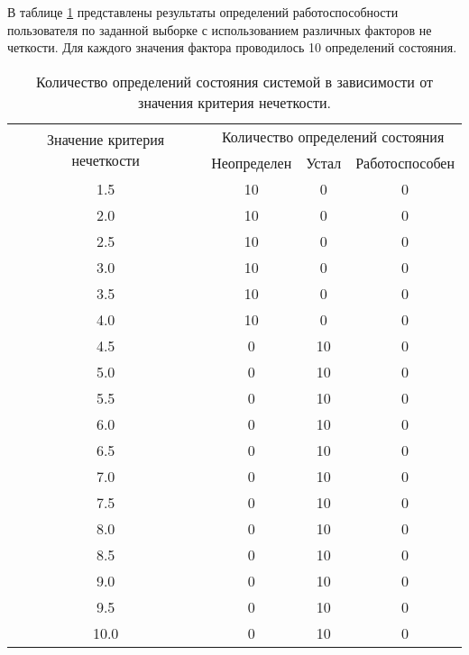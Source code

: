 В таблице \ref{table:time2} представлены результаты определений работоспособности пользователя по заданной выборке с использованием различных факторов не \- четкости. Для каждого значения фактора проводилось 10 определений состояния.

\begin{table}[H]
	\begin{center}
		\caption{\label{table:time2} Количество определений состояния системой в зависимости от значения критерия нечеткости.}
\begin{tabular}{|c|ccc|}
\hline
\multirow{2}{*}{Значение критерия нечеткости} & \multicolumn{3}{c|}{Количество определений состояния}\\ \cline{2-4} & \multicolumn{1}{c|}{Неопределен} & \multicolumn{1}{c|}{Устал} & Работоспособен \\ \hline
1.5& \multicolumn{1}{c|}{10}            & \multicolumn{1}{c|}{0}      &0 \\ \hline
2.0& \multicolumn{1}{c|}{10}            & \multicolumn{1}{c|}{0}     &0 \\ \hline
2.5& \multicolumn{1}{c|}{10}            & \multicolumn{1}{c|}{0}     &0 \\ \hline
3.0& \multicolumn{1}{c|}{10}            & \multicolumn{1}{c|}{0}      &0 \\ \hline
3.5& \multicolumn{1}{c|}{10}            & \multicolumn{1}{c|}{0}      &0 \\ \hline
4.0& \multicolumn{1}{c|}{10}            & \multicolumn{1}{c|}{0}      &0 \\ \hline
4.5& \multicolumn{1}{c|}{0}            & \multicolumn{1}{c|}{10}      &0 \\ \hline
5.0& \multicolumn{1}{c|}{0}            & \multicolumn{1}{c|}{10}      &0 \\ \hline
5.5& \multicolumn{1}{c|}{0}            & \multicolumn{1}{c|}{10}      &0 \\ \hline
6.0& \multicolumn{1}{c|}{0}            & \multicolumn{1}{c|}{10}      &0 \\ \hline
6.5& \multicolumn{1}{c|}{0}            & \multicolumn{1}{c|}{10}      &0 \\ \hline
7.0& \multicolumn{1}{c|}{0}            & \multicolumn{1}{c|}{10}      &0 \\ \hline
7.5& \multicolumn{1}{c|}{0}            & \multicolumn{1}{c|}{10}      &0 \\ \hline
8.0& \multicolumn{1}{c|}{0}            & \multicolumn{1}{c|}{10}      &0 \\ \hline
8.5& \multicolumn{1}{c|}{0}            & \multicolumn{1}{c|}{10}      &0 \\ \hline
9.0& \multicolumn{1}{c|}{0}            & \multicolumn{1}{c|}{10}      &0 \\ \hline
9.5& \multicolumn{1}{c|}{0}            & \multicolumn{1}{c|}{10}      &0 \\ \hline
10.0& \multicolumn{1}{c|}{0}            & \multicolumn{1}{c|}{10}     &0 \\ \hline
\end{tabular}
	\end{center}
\end{table}

